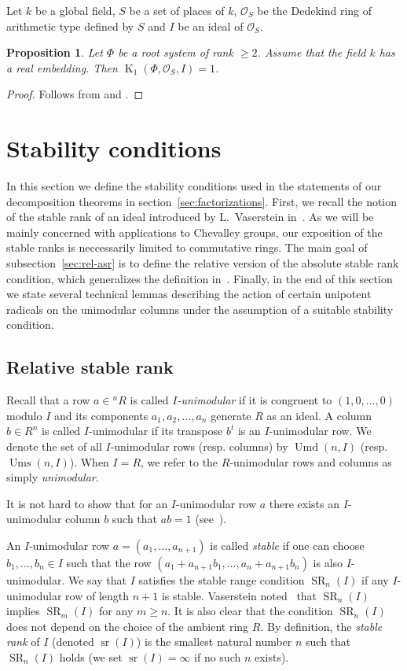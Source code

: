 \documentclass[oneside, 12pt]{amsart}
\theoremstyle{plain}
\numberwithin{equation}{section}
\numberwithin{lemma}{section}
\newtheorem{prop}[lemma]{Proposition}
\theoremstyle{definition}
\theoremstyle{remark}
\DeclareMathOperator{\K}{K}
\DeclareMathOperator{\SR}{SR}
\DeclareMathOperator{\sr}{sr}
\DeclareMathOperator{\Ums}{Ums}
\DeclareMathOperator{\Umd}{Umd}
\begin{document}
Let $k$ be a global field, $S$ be a set of places of $k$, 
$\mathcal{O}_S$ be the Dedekind ring of arithmetic type defined by $S$ and $I$ be an ideal of $\mathcal{O}_S$.
\begin{prop} \label{prop:K1triv}
Let $\Phi$ be a root system of rank $\geqslant2$. Assume that the field $k$ has a real embedding. Then $\K_1(\Phi, \mathcal{O}_S, I)=1$.
\end{prop}
\begin{proof} Follows from \cite[Theorem~3.6]{BMS} and \cite[Corollary~4.5]{Ma69}. \end{proof}

\section{Stability conditions}\label{sec:stability-conditions}
In this section we define the stability conditions used in the statements of our decomposition theorems in section~\ref{sec:factorizations}.
First, we recall the notion of the stable rank of an ideal introduced by L.~Vaserstein in~\cite{Va69, Va71}.
As we will be mainly concerned with applications to Chevalley groups, our exposition of the stable ranks is neccessarily limited to commutative rings.
The main goal of subsection~\ref{sec:rel-asr} is to define the relative version of the absolute stable rank condition, which generalizes the definition in~\cite{EO, MKV}.
Finally, in the end of this section we state several technical lemmas describing the action of certain unipotent radicals on the unimodular columns under the assumption of a suitable stability condition.

\subsection{Relative stable rank}
Recall that a row $a\in{}^n\!R$ is called \emph{$I$-unimodular} if it is congruent to $(1, 0, \ldots, 0)$ modulo $I$ and its components $a_1, a_2, \ldots, a_n$ generate $R$ as an ideal.
A column $b \in R^n$ is called $I$-unimodular if its transpose $b^t$ is an $I$-unimodular row.
We denote the set of all $I$-unimodular rows (resp. columns) by $\Umd(n, I)$ (resp. $\Ums(n, I)$).
When $I=R$, we refer to the $R$-unimodular rows and columns as simply \emph{unimodular}.

It is not hard to show that for an $I$-unimodular row $a$ there exists an $I$-unimodular column $b$ such that $ab=1$ (see~\cite[\S~2]{Va69}).

An $I$-unimodular row $a=(a_1, \ldots, a_{n+1})$ is called \emph{stable} if one can choose $b_1, \ldots, b_n\in I$ such that the row $(a_1+a_{n+1}b_1, \ldots, a_n+a_{n+1}b_n)$ is also $I$-unimodular. 
We say that $I$ satisfies the stable range condition $\SR_n(I)$ if any $I$-unimodular row of length $n+1$ is stable.
Vaserstein noted~\cite[Theorem~1]{Va71} that $\SR_n(I)$ implies $\SR_m(I)$ for any $m\geqslant n$. 
It is also clear that the condition $\SR_n(I)$ does not depend on the choice of the ambient ring $R$.
By definition, the \emph{stable rank} of $I$ (denoted $\sr(I)$) is the smallest natural number $n$ such that $\SR_n(I)$ holds (we set $\sr(I)=\infty$ if no such $n$ exists).
\end{document}
